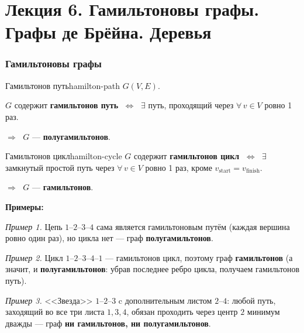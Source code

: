 \chapter{Лекция 6. Гамильтоновы графы. Графы де Брёйна. Деревья}


\subsection*{Гамильтоновы графы}

\begin{defn}{Гамильтонов путь}{hamilton-path}
$G(V, E)$.

$G$ содержит \textbf{гамильтонов путь} $\;\Leftrightarrow\;$ $\exists$ путь, проходящий через
$\forall\, v \in V$ ровно 1 раз.

$\Rightarrow\;$ $G$ --- \textbf{полугамильтонов}.
\end{defn}

\begin{defn}{Гамильтонов цикл}{hamilton-cycle}
$G$ содержит \textbf{гамильтонов цикл} $\;\Leftrightarrow\;$ $\exists$ замкнутый простой путь через
$\forall\, v \in V$ ровно 1 раз, кроме $v_{\text{start}} = v_{\text{finish}}$.

$\Rightarrow\;$ $G$ --- \textbf{гамильтонов}.
\end{defn}

\medskip
\noindent\textbf{Примеры:}

\noindent\textit{Пример 1.} Цепь $1$--$2$--$3$--$4$ сама является гамильтоновым
путём (каждая вершина ровно один раз), но цикла нет --- граф
\textbf{полугамильтонов}.

\noindent\textit{Пример 2.} Цикл $1$--$2$--$3$--$4$--$1$ --- гамильтонов цикл,
поэтому граф \textbf{гамильтонов} (а значит, и \textbf{полугамильтонов}:
убрав последнее ребро цикла, получаем гамильтонов путь).

\noindent\textit{Пример 3.} <<Звезда>> $1$--$2$--$3$ c дополнительным листом
$2$--$4$: любой путь, заходящий во все три листа $1, 3, 4$, обязан
проходить через центр $2$ минимум дважды --- граф \textbf{ни гамильтонов,
ни полугамильтонов}.

